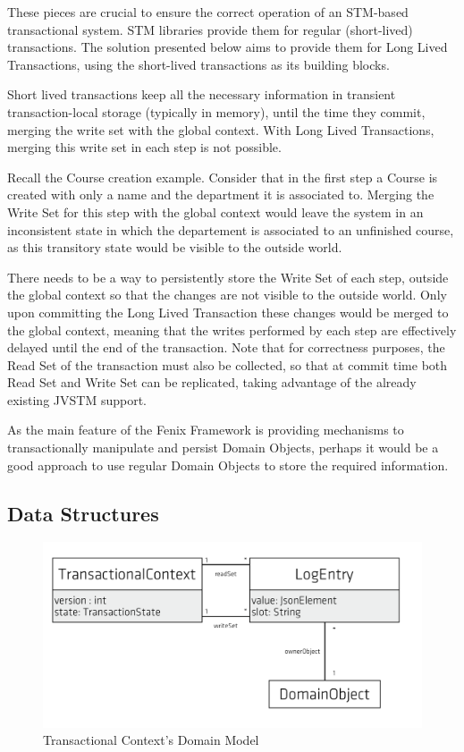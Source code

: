 These pieces are crucial to ensure the correct operation of an
STM-based transactional system. STM libraries provide them for regular
(short-lived) transactions. The solution presented below aims to
provide them for Long Lived Transactions, using the short-lived
transactions as its building blocks.

Short lived transactions keep all the necessary information in
transient transaction-local storage (typically in memory), until the
time they commit, merging the write set with the global context. With
Long Lived Transactions, merging this write set in each step is not
possible. 

Recall the Course creation example. Consider that in the first step a
Course is created with only a name and the department it is associated
to. Merging the Write Set for this step with the global context would
leave the system in an inconsistent state in which the departement is
associated to an unfinished course, as this transitory state would be
visible to the outside world.

There needs to be a way to persistently store the Write Set of each
step, outside the global context so that the changes are not visible
to the outside world. Only upon committing the Long Lived Transaction
these changes would be merged to the global context, meaning that the
writes performed by each step are effectively delayed until the end of
the transaction. Note that for correctness purposes, the Read Set of
the transaction must also be collected, so that at commit time both
Read Set and Write Set can be replicated, taking advantage of the
already existing JVSTM support.

As the main feature of the Fenix Framework is providing mechanisms to
transactionally manipulate and persist Domain Objects, perhaps it
would be a good approach to use regular Domain Objects to store the
required information.

\subsection{Data Structures}

\begin{figure}
\centering
\includegraphics[width=0.8\linewidth]{tx-context}
\caption{Transactional Context's Domain Model}
\label{fig:transactionalContext}
\end{figure}

